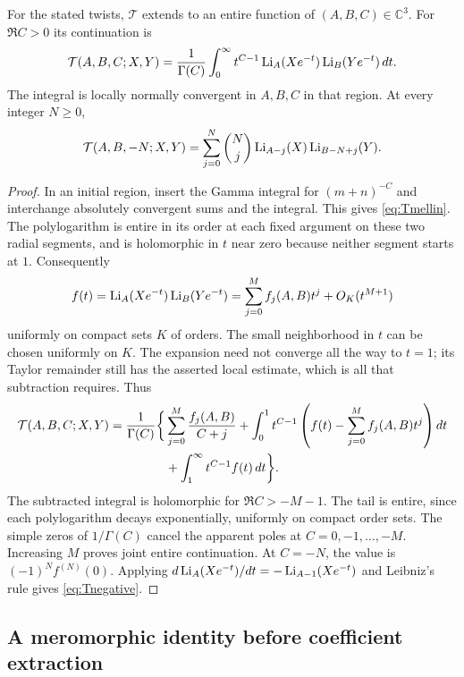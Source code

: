 \begin{lemma}
\label{lem:Tentire}
For the stated twists, $\mathcal T$ extends to an entire function of
$(A,B,C)\in\mathbb C^3$.  For $\Re C>0$ its continuation is
\begin{equation}\label{eq:Tmellin}
 \mathcal T(A,B,C;X,Y)=\frac1{\Gamma(C)}
 \int_0^\infty t^{C-1}\operatorname{Li}_A(Xe^{-t})\operatorname{Li}_B(Ye^{-t})\,dt.
\end{equation}
The integral is locally normally convergent in $A,B,C$ in that region.
At every integer $N\ge0$,
\begin{equation}\label{eq:Tnegative}
 \mathcal T(A,B,-N;X,Y)
 =\sum_{j=0}^{N}\binom Nj\operatorname{Li}_{A-j}(X)\operatorname{Li}_{B-N+j}(Y).
\end{equation}
\end{lemma}
\begin{proof}
In an initial region, insert the Gamma integral for $(m+n)^{-C}$ and
interchange absolutely convergent sums and the integral.  This gives
\eqref{eq:Tmellin}.  The polylogarithm is entire in its order at each fixed
argument on these two radial segments, and is holomorphic in $t$ near
zero because neither segment starts at $1$.  Consequently
\[
 f(t)=\operatorname{Li}_A(Xe^{-t})\operatorname{Li}_B(Ye^{-t})
      =\sum_{j=0}^{M}f_j(A,B)t^j+O_K(t^{M+1})
\]
uniformly on compact sets $K$ of orders.  The small neighborhood in $t$
can be chosen uniformly on $K$.  The expansion need not converge all the
way to $t=1$; its Taylor remainder still has the asserted local estimate,
which is all that subtraction requires.  Thus
\begin{align}\label{eq:Tcontinuation}
 \mathcal T(A,B,C;X,Y)=\frac1{\Gamma(C)}\bigg\{
 &\sum_{j=0}^{M}\frac{f_j(A,B)}{C+j}
 +\int_0^1 t^{C-1}\left(f(t)-\sum_{j=0}^{M}f_j(A,B)t^j\right)dt\notag\\
 &+\int_1^\infty t^{C-1}f(t)\,dt\bigg\}.
\end{align}
The subtracted integral is holomorphic for $\Re C>-M-1$.  The tail is
entire, since each polylogarithm decays exponentially, uniformly on
compact order sets.  The simple zeros of $1/\Gamma(C)$ cancel the apparent
poles at $C=0,-1,\ldots,-M$.  Increasing $M$ proves joint entire
continuation.  At $C=-N$, the value is $(-1)^N f^{(N)}(0)$.
Applying $d\operatorname{Li}_A(Xe^{-t})/dt=-\operatorname{Li}_{A-1}(Xe^{-t})$ and Leibniz's rule gives
\eqref{eq:Tnegative}.
\end{proof}

\subsection{A meromorphic identity before coefficient extraction}

